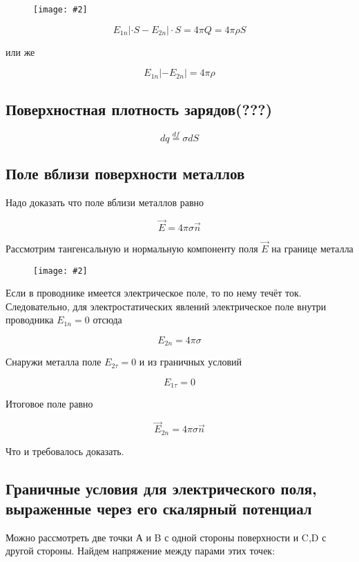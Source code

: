 \documentclass[a4paper,12pt]{article}
\newcommand{\fc}[1]{\[#1\]}
\newcommand{\imc}[2][0.7\textwidth]{%
    \begin{figure}[h!]
        \centering
        \texttt{[image: \#2]}
    \end{figure}%
}
\begin{document}
\imc[0.7\textwidth]{11.png}

\fc{E_{1n}|\cdot S-E_{2n}|\cdot S=4\pi Q=4\pi \rho S}

или же 

\fc{E_{1n}| -E_{2n}| =4\pi \rho }

\subsection*{Поверхностная плотность зарядов(???)}

\fc{dq\overset{df}{=}\sigma dS}

\newpage


\subsection*{Поле вблизи поверхности металлов}

Надо доказать что поле вблизи металлов равно

\fc{\vec{E}=4\pi \sigma \vec{n}}

Рассмотрим тангенсальную и нормальную компоненту поля $\vec{E}$ на границе металла
 
\imc[0.7\textwidth]{12.png}

Если в проводнике имеется электрическое поле, то по нему течёт ток. Следовательно, для электростатических явлений электрическое поле внутри проводника $E_{1n}=0$ отсюда 

\fc{E_{2n}=4\pi \sigma}

Снаружи металла поле $E_{2\tau }=0$ и из граничных условий  

\fc{E_{1\tau}=0}

Итоговое поле равно 

\fc{\vec{E}_{2n}=4\pi \sigma \vec{n}}

Что и требовалось доказать.

\newpage


\subsection*{Граничные условия для электрического поля,
выраженные через его скалярный потенциал}

Можно рассмотреть две точки А и B с одной стороны поверхности и C,D с другой стороны. Найдем напряжение между парами этих  точек:

\begin{center}
\end{center}
\end{document}
